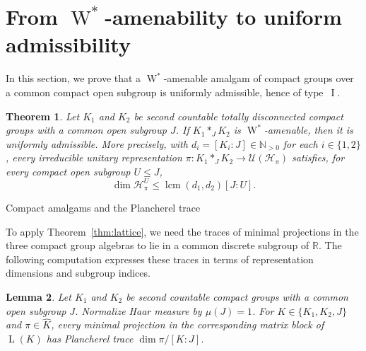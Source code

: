 \documentclass[11pt]{amsart}
\makeatletter
\numberwithin{equation}{section}
\def\subsection{\@startsection{subsection}{2}%
  \z@{.7\linespacing\@plus.7\linespacing}{.3\linespacing}%
  {\normalfont\bfseries}}
\newcommand{\nn}{\mathbb N}
\newcommand{\rr}{\mathbb R}
\renewcommand{\H}{\mathcal H}
\newcommand{\U}{\mathcal U}
\DeclareMathOperator{\LL}{L}
\DeclareMathOperator{\I}{I}
\DeclareMathOperator{\lcm}{lcm}
\newcommand{\Wstar}{\operatorname{W}^*}
\newtheorem{The}{Theorem}[section]
\newtheorem{Lem}[The]{Lemma}
\theoremstyle{definition}
\makeatother
\begin{document}
\section{From \texorpdfstring{$\Wstar$}{W*}-amenability to uniform admissibility}
\label{sec:compact-amalgams}
In this section, we prove that a $\Wstar$-amenable amalgam of compact groups over a common compact open subgroup is uniformly admissible, hence of type~$\I$.

\begin{The}
    \label{thm:compact-amalgam-ccr}
    Let $K_1$ and $K_2$ be second countable totally disconnected compact groups with a common open subgroup $J$. If $K_1\ast_JK_2$ is $\Wstar$-amenable, then it is uniformly admissible. More precisely, with $d_i=[K_i:J]\in\nn_{>0}$ for each $i\in\{1,2\}$, every irreducible unitary representation $\pi:K_1\ast_JK_2\to\U(\H_\pi)$ satisfies, for every compact open subgroup $U\leq J$,
    $$
        \dim\H_\pi^U\leq\lcm\left(d_1,d_2\right)[J:U].
    $$
\end{The}


\subsection{Compact amalgams and the Plancherel trace}
\label{subsec:compact-plancherel}

To apply Theorem~\ref{thm:lattice}, we need the traces of minimal projections in the three compact group algebras to lie in a common discrete subgroup of $\rr$. The following computation expresses these traces in terms of representation dimensions and subgroup indices.

\begin{Lem}
    \label{lem:compact-amalgam-afp}
    Let $K_1$ and $K_2$ be second countable compact groups with a common open subgroup $J$. Normalize Haar measure by $\mu(J)=1$. For $K\in\{K_1,K_2,J\}$ and $\pi\in\widehat K$, every minimal projection in the corresponding matrix block of $\LL(K)$ has Plancherel trace $\dim\pi/[K:J]$.
\end{Lem}
\end{document}
